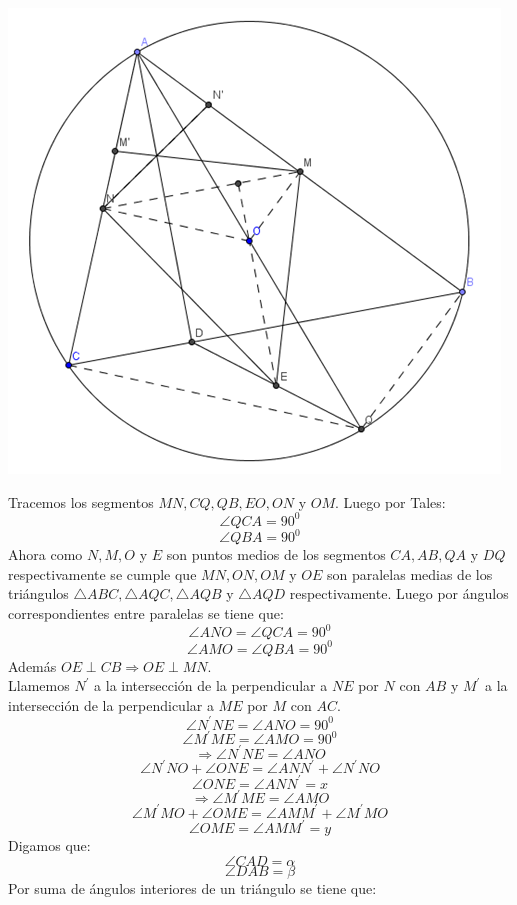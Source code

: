 \documentclass{book}
\begin{document}
\begin{enumerate}
\begin{center}
              \includegraphics[scale=1]{imagenes/Geometria/19.png}
          \end{center}
          Tracemos los segmentos $MN,CQ,QB,EO,ON$ y $OM$. Luego por Tales:
          $$\angle QCA=90^0$$
          $$\angle QBA=90^0$$
          Ahora como $N,M,O$ y $E$ son puntos medios de los segmentos $CA,AB,QA$ y $DQ$ respectivamente se cumple que $MN,ON,OM$ y $OE$ son paralelas medias de los triángulos $\triangle ABC,\triangle AQC,\triangle AQB$ y $\triangle AQD$ respectivamente. Luego por ángulos correspondientes entre paralelas se tiene que:
          $$\angle ANO=\angle QCA=90^0$$
          $$\angle AMO=\angle QBA=90^0$$
          Además $OE\perp CB\Rightarrow OE\perp MN$.\\
          Llamemos $N^{'}$ a la intersección de la perpendicular a $NE$ por $N$ con $AB$ y  $M^{'}$ a la intersección de la perpendicular a $ME$ por $M$ con $AC$.
          $$\angle N^{'} NE=\angle ANO=90^0$$
          $$\angle M^{'} ME=\angle AMO=90^0$$
          $$\Rightarrow\angle N^{'}NE=\angle ANO$$
          $$\angle N^{'} NO+\angle ONE=\angle ANN^{'}+\angle N^{'} NO$$
          $$\angle ONE=\angle ANN^{'}=x$$
          $$\Rightarrow\angle M^{'} ME=\angle AMO$$
          $$\angle M^{'} MO+\angle OME=\angle AMM^{'}+\angle M^{'} MO$$
          $$\angle OME=\angle AMM^{'}=y$$
          Digamos que:
          $$\angle CAD=\alpha$$
          $$\angle DAB=\beta$$
          Por suma de ángulos interiores de un triángulo se tiene que:

\end{enumerate}
\end{document}

